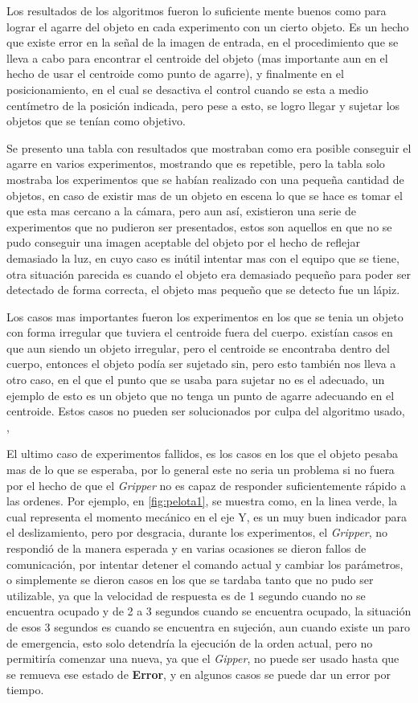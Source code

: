 Los resultados de los algoritmos fueron lo suficiente mente buenos como para lograr el agarre del objeto en cada experimento con un cierto objeto.
Es un hecho que existe error en la señal de la imagen de entrada, en el procedimiento que se lleva a cabo para encontrar el centroide del objeto (mas importante aun en el hecho de usar el centroide como punto de agarre), y finalmente en el posicionamiento, en el cual se desactiva el control cuando se esta a medio centímetro de la posición indicada, pero pese a esto, se logro llegar y sujetar los objetos que se tenían como objetivo.

Se presento una tabla con resultados que mostraban como era posible conseguir el agarre en varios experimentos, mostrando que es repetible, pero la tabla solo mostraba los experimentos que se habían realizado con una pequeña cantidad de objetos, en caso de existir mas de un objeto en escena lo que se hace es tomar el que esta mas cercano a la cámara, pero aun así, existieron una serie de experimentos que no pudieron ser presentados, estos son aquellos en que no se pudo conseguir una  imagen aceptable del objeto por el hecho de reflejar demasiado la luz, en cuyo caso es inútil intentar mas con el equipo que se tiene, otra situación parecida es cuando el objeto era demasiado pequeño para poder ser detectado de forma correcta, el objeto mas pequeño que se detecto fue un lápiz.

Los casos mas importantes fueron los experimentos en los que se tenia un objeto con forma irregular que tuviera el centroide fuera del cuerpo. existían casos en que aun siendo un objeto irregular, pero el centroide se encontraba dentro del cuerpo, entonces el objeto podía ser sujetado sin, pero esto también nos lleva a otro caso, en el que el punto que se usaba para sujetar no es el adecuado, un ejemplo de esto es un objeto que no tenga un punto de agarre adecuando en el centroide. Estos casos no pueden ser solucionados por culpa del algoritmo usado, , 



El ultimo caso de experimentos fallidos, es los casos en los que el objeto pesaba mas de lo que se esperaba, por lo general este no seria un problema si no fuera por el hecho de que el \textit{Gripper} no es capaz de responder suficientemente rápido a las ordenes. Por ejemplo, en \cref{fig:pelota1}, se muestra como, en la linea verde, la cual representa el momento mecánico en el eje Y, es un muy buen indicador para el deslizamiento, pero por desgracia, durante los experimentos, el \textit{Gripper}, no respondió de la manera esperada y en varias ocasiones se dieron fallos de comunicación, por intentar detener el comando actual y cambiar los parámetros, o simplemente se dieron casos en los que se tardaba tanto que no pudo ser utilizable, ya que la velocidad de respuesta es de 1 segundo cuando no se encuentra ocupado y de 2 a 3 segundos cuando se encuentra ocupado, la situación de esos 3 segundos es cuando se encuentra en sujeción, aun cuando existe un paro de emergencia, esto solo detendría la ejecución de la orden actual, pero no permitiría comenzar una nueva, ya que el \textit{Gipper}, no puede ser usado hasta que se remueva ese estado de \textbf{Error}, y en algunos casos se puede dar un  error por tiempo.


